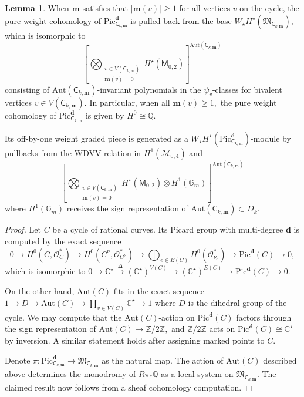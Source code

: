 \documentclass[12pt,reqno]{amsart}
\theoremstyle{definition}
\theoremstyle{definition}
\theoremstyle{definition}
\theoremstyle{definition}
\newtheorem{lemma}[theorem]{Lemma}
\begin{document}
\begin{lemma}\label{lem:Piccyc}
  When $\mathbf{m}$ satisfies that $|\mathbf{m}(v)|\geq 1$ for all vertices $v$ on the cycle, the pure weight cohomology of $\mathrm{Pic}^{\mathbf{d}}_{\mathsf{C}_{k, \mathbf{m}}}$ is pulled back from the base $W_\star H^\star(\mathfrak{M}_{\mathsf{C}_{k, \mathbf{m}}})$, which is isomorphic to $$\left[\bigotimes_{\substack{v\in V(\mathsf{C}_{k, \mathbf{m}})\\ \mathbf{m}(v)=0}}H^\star\left(\mathsf{M}_{0,2}\right)\right]^{\mathrm{Aut}(\mathsf{C}_{k, \mathbf{m}})}$$ consisting of $\mathrm{Aut}(\mathsf{C}_{k, \mathbf{m}})$-invariant polynomials in the $\psi_v$-classes for bivalent vertices $v\in V(\mathsf{C}_{k, \mathbf{m}}).$ In particular, when all $\mathbf{m}(v)\geq 1,$ the pure weight cohomology of $\mathrm{Pic}^{\mathbf{d}}_{\mathsf{C}_{k, \mathbf{m}}}$ is given by $H^0\cong \mathbb{Q}.$
  
  Its off-by-one weight graded piece is generated as a $W_\star H^\star(\mathrm{Pic}^{\mathbf{d}}_{\mathsf{C}_{k, \mathbf{m}}})$-module by pullbacks from the WDVV relation in $H^1(\mathcal{M}_{0,4})$ and $$\left[\bigotimes_{\substack{v\in V(\mathsf{C}_{k, \mathbf{m}})\\ \mathbf{m}(v)=0}}H^\star\left(\mathsf{M}_{0,2}\right)\otimes H^1(\mathbb{G}_m)\right]^{\mathrm{Aut}(\mathsf{C}_{k, \mathbf{m}})}$$ where $H^1(\mathbb{G}_m)$ receives the sign representation of $\mathrm{Aut}(\mathsf{C}_{k, \mathbf{m}})\subset D_k.$
\end{lemma}
\begin{proof}
  Let $C$ be a cycle of rational curves. Its Picard group with multi-degree $\boldsymbol{d}$ is computed by the exact sequence $$0\to H^0(C, \mathcal{O}_C^*)\to H^0(C^\nu, \mathcal{O}_{C^\nu}^*)\to \bigoplus_{e\in E(C)}H^0(\mathcal{O}_{\nu_e}^*)\to \mathrm{Pic}^{\boldsymbol{d}}(C)\to 0,$$ which is isomorphic to $0\to \mathbb{C}^\star\xrightarrow{\Delta} (\mathbb{C}^\star)^{V(C)}\to (\mathbb{C}^\star)^{E(C)}\to \mathrm{Pic}^{\boldsymbol{d}}(C)\to 0.$

  On the other hand, $\mathrm{Aut}(C)$ fits in the exact sequence $1\to D\to \mathrm{Aut}(C)\to \prod_{v\in V(C)}\mathbb{C}^\star\to 1$ where $D$ is the dihedral group of the cycle. We may compute that the $\mathrm{Aut}(C)$-action on $\mathrm{Pic}^{\boldsymbol{d}}(C)$ factors through the sign representation of $\mathrm{Aut}(C)\to \mathbb{Z}/2 \mathbb{Z},$ and $\mathbb{Z}/2 \mathbb{Z}$ acts on $\mathrm{Pic}^{\boldsymbol{d}}(C)\cong \mathbb{C}^\star$ by inversion. A similar statement holds after assigning marked points to $C$.

  Denote $\pi: \mathrm{Pic}^{\mathbf{d}}_{\mathsf{C}_{k, \mathbf{m}}}\to \mathfrak{M}_{\mathsf{C}_{k, \mathbf{m}}}$ as the natural map. The action of $\mathrm{Aut}(C)$ described above determines the monodromy of $R\pi_* \mathbb{Q}$ as a local system on $\mathfrak{M}_{\mathsf{C}_{k, \mathbf{m}}}.$ The claimed result now follows from a sheaf cohomology computation.
  \end{proof}
\end{document}
